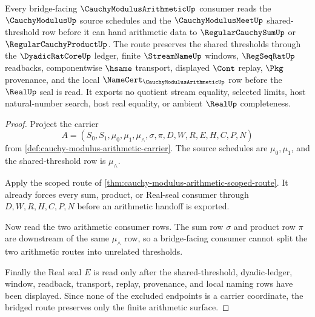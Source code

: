 \begin{theorem}
\label{thm:cauchy-modulus-arithmetic-bridged-route}
Every bridge-facing $\CauchyModulusArithmeticUp$ consumer reads the $\CauchyModulusUp$ source schedules and the $\CauchyModulusMeetUp$ shared-threshold row before it can hand arithmetic data to $\RegularCauchySumUp$ or $\RegularCauchyProductUp$. The route preserves the shared thresholds through the $\DyadicRatCoreUp$ ledger, finite $\StreamNameUp$ windows, $\RegSeqRatUp$ readbacks, componentwise $\hsame$ transport, displayed $\Cont$ replay, $\Pkg$ provenance, and the local $\NameCert_{\CauchyModulusArithmeticUp}$ row before the $\RealUp$ seal is read. It exports no quotient stream equality, selected limits, host natural-number search, host real equality, or ambient $\RealUp$ completeness.
\end{theorem}
\begin{proof}
Project the carrier
$$
A=(S_0,S_1,\mu_0,\mu_1,\mu_{\wedge},\sigma,\pi,D,W,R,E,H,C,P,N)
$$
from \autoref{def:cauchy-modulus-arithmetic-carrier}. The source schedules are $\mu_0,\mu_1$, and the shared-threshold row is $\mu_{\wedge}$.

Apply the scoped route of \autoref{thm:cauchy-modulus-arithmetic-scoped-route}. It already forces every sum, product, or Real-seal consumer through $D,W,R,H,C,P,N$ before an arithmetic handoff is exported.

Now read the two arithmetic consumer rows. The sum row $\sigma$ and product row $\pi$ are downstream of the same $\mu_{\wedge}$ row, so a bridge-facing consumer cannot split the two arithmetic routes into unrelated thresholds.

Finally the Real seal $E$ is read only after the shared-threshold, dyadic-ledger, window, readback, transport, replay, provenance, and local naming rows have been displayed. Since none of the excluded endpoints is a carrier coordinate, the bridged route preserves only the finite arithmetic surface.
\end{proof}
